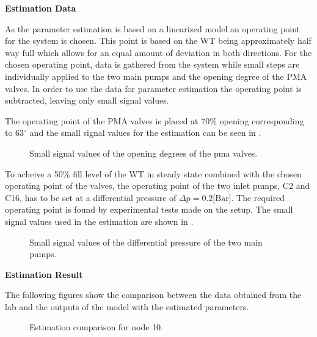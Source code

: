 \textbf{Estimation Data}

As the parameter estimation is based on a linearized model an operating point for the system is chosen. This point is based on the WT being approximately half way full which allows for an equal amount of deviation in both directions. For the chosen operating point, data is gathered from the system while small steps are individually applied to the two main pumps and the opening degree of the PMA valves. In order to use the data for parameter estimation the operating point is subtracted, leaving only small signal values.  

The operating point of the PMA valves is placed at $70\%$ opening corresponding to $63^{\circ}$ and the small signal values for the estimation can be seen in .

\begin{figure}[H]
\centering
 
\caption{Small signal values of the opening degrees of the pma valves.}
\label{fig:est_OD_data_final}
\end{figure}

To acheive a 50\% fill level of the WT in steady state combined with the chosen operating point of the valves, the operating point of the two inlet pumps, C2 and C16, has to be set at a differential pressure of $\Delta p = 0.2 \text{[Bar]}$. The required operating point is found by experimental tests made on the setup. The small signal values used in the estimation are shown in . 

\begin{figure}[H]
\centering
 
\caption{Small signal values of the differential pressure of the two main pumps.}
\label{fig:est_deltap_data_final}
\end{figure}



\textbf{Estimation Result}

The following figures show the comparison between the data obtained from the lab and the outputs of the model with the estimated parameters.  

\begin{figure}[H]
  \centering
    
    \caption{Estimation comparison for node 10.}
\end{figure}


